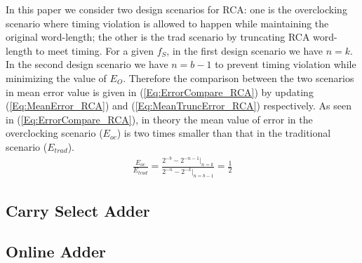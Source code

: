 \documentclass[10pt, conference, compsocconf]{IEEEtran}
\begin{document}
In this paper we consider two design scenarios for RCA: one is the overclocking scenario where timing violation is allowed to happen while maintaining the original word-length; the other is the trad scenario by truncating RCA word-length to meet timing. For a given $f_S$, in the first design scenario we have $n=k$. In the second design scenario we have $n=b-1$ to prevent timing violation while minimizing the value of $E_O$. Therefore the comparison between the two scenarios in mean error value is given in (\ref{Eq:ErrorCompare_RCA}) by updating (\ref{Eq:MeanError_RCA}) and (\ref{Eq:MeanTruncError_RCA}) respectively. As seen in (\ref{Eq:ErrorCompare_RCA}), in theory the mean value of error in the overclocking scenario ($E_{oc}$) is two times smaller than that in the traditional scenario ($E_{trad}$).
%
\begin{eqnarray}\label{Eq:ErrorCompare_RCA}
    \frac{E_{oc}}{E_{trad}} = \frac{2^{-b}-2^{-n-1}|_{n=k}}{2^{-n}-2^{-k}|_{n=b-1}}=\frac{1}{2}
\end{eqnarray}

\subsection{Carry Select Adder}



\subsection{Online Adder}
\end{document}
